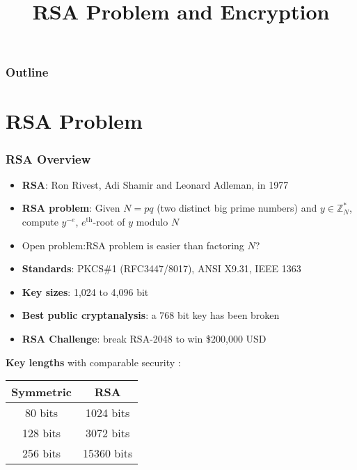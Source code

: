 

\title{RSA Problem and Encryption}


\maketitle
\begin{frame}
\frametitle{Outline}
\tableofcontents
\end{frame}
\section{RSA Problem}
\begin{frame}\frametitle{RSA Overview}
\begin{itemize}
\item \textbf{RSA}: Ron Rivest, Adi Shamir and Leonard Adleman, in 1977
\item \textbf{RSA problem}: Given $N = pq$ (two distinct big prime numbers) and $y \in \mathbb{Z}^*_N$, compute $y^{-e}$, $e^{\text{th}}$-root of $y$ modulo $N$
\item \alert{Open problem}:RSA problem is easier than factoring $N$?
\item \textbf{Standards}: PKCS\#1 (RFC3447/8017), ANSI X9.31, IEEE 1363
\item \textbf{Key sizes}: 1,024 to 4,096 bit
\item \textbf{Best public cryptanalysis}: a 768 bit key has been broken
\item \textbf{RSA Challenge}: break RSA-2048 to win \$200,000 USD
\end{itemize}
\textbf{Key lengths} with comparable security :
\begin{center}
\begin{tabular}{|c|c|} \hline
Symmetric & RSA  \\ \hline
80 bits & 1024 bits   \\
128 bits & 3072 bits  \\
256 bits & 15360 bits \\ \hline
\end{tabular}	
\end{center}
\end{frame}
